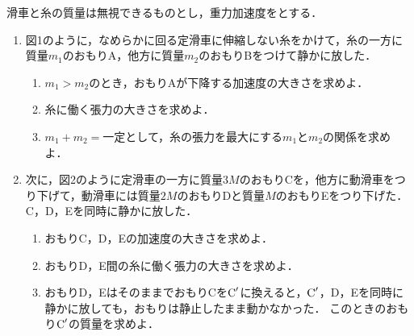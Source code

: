 滑車と糸の質量は無視できるものとし，重力加速度を\g とする．

\begin{enumerate}[〔A〕]
  \setlength{\leftskip}{-1.5zw}
  \setlength{\itemindent}{1zw}\setlength{\labelsep}{0.5zw}
  \setlength{\labelwidth}{1zw}\setlength{\leftmargin}{1zw}
  \setlength{\itemsep}{0.5\baselineskip}
  \item 図1のように，なめらかに回る定滑車に伸縮しない糸をかけて，糸の一方に質量$m_1$のおもりA，他方に質量$m_2$のおもりBをつけて静かに放した．
  \begin{enumerate}[（1）]
    \setlength{\leftskip}{-2.5zw}
    \setlength{\itemindent}{1zw}\setlength{\labelsep}{1zw}
    \setlength{\labelwidth}{1zw}
    \item $m_1 > m_2$のとき，おもりAが下降する加速度の大きさを求めよ．
    \item 糸に働く張力の大きさを求めよ．
    \item $m_1 + m_2 = \text{一定}$として，糸の張力を最大にする$m_1$と$m_2$の関係を求めよ．
  \end{enumerate}
  \item 次に，図2のように定滑車の一方に質量$3M$のおもりCを，他方に動滑車をつり下げて，動滑車には質量$2M$のおもりDと質量$M$のおもりEをつり下げた．C，D，Eを同時に静かに放した．
  \begin{enumerate}[（1）]
    \setlength{\leftskip}{-2.5zw}
    \setlength{\itemindent}{1zw}\setlength{\labelsep}{1zw}
    \setlength{\labelwidth}{1zw}
    \setcounter{enumii}{3}
    \item おもりC，D，Eの加速度の大きさを求めよ．
    \item おもりD，E間の糸に働く張力の大きさを求めよ．
    \item おもりD，EはそのままでおもりCを$\textup{C}^\prime$に換えると，$\textup{C}^\prime$，D，Eを同時に静かに放しても，おもりは静止したまま動かなかった．
    このときのおもり$\textup{C}^\prime$の質量を求めよ．
  \end{enumerate}
\end{enumerate}

